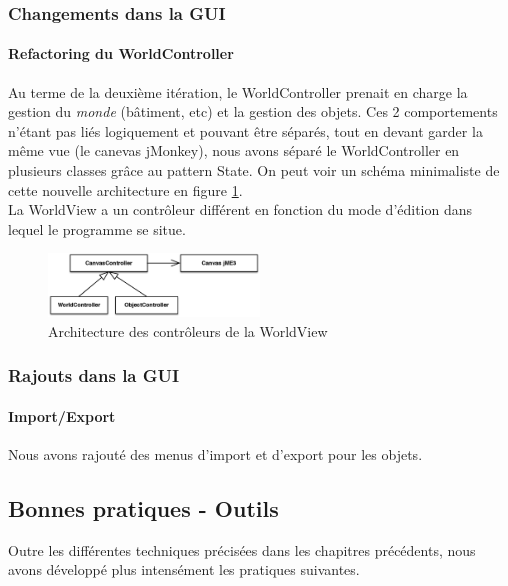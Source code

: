 	\subsubsection{Changements dans la GUI}

		\paragraph{Refactoring du WorldController}
		Au terme de la deuxième itération, le WorldController prenait en charge 
		la gestion du \textit{monde} (bâtiment, etc) et la gestion des objets.
		Ces 2 comportements n'étant pas liés logiquement et pouvant être séparés,
		tout en devant garder la même vue (le canevas jMonkey), nous avons séparé
		le WorldController en plusieurs classes grâce au pattern State.
		On peut voir un schéma minimaliste de cette nouvelle architecture en 
		figure \ref{fig:gui:newworldcontroller}.\\

		La WorldView a un contrôleur différent en fonction du mode d'édition
		dans lequel le programme se situe. 
		\begin{figure}
			\center
			\includegraphics[width=0.5\textwidth]{iteration3/fig/WorldState.eps}
			\caption{\label{fig:gui:newworldcontroller} Architecture des contrôleurs de la WorldView}
		\end{figure}

	\subsubsection{Rajouts dans la GUI}

		\paragraph{Import/Export}
		Nous avons rajouté des menus d'import et d'export pour les objets.


\subsection{Bonnes pratiques - Outils}

	Outre les différentes techniques précisées dans les chapitres précédents, 
	nous avons développé plus intensément les pratiques suivantes.

